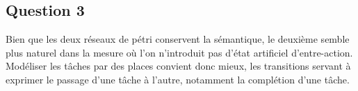 \subsection*{Question 3}

Bien que les deux réseaux de pétri conservent la sémantique, le
deuxième semble plus naturel dans la mesure où l'on n'introduit pas
d'état artificiel d'entre-action. Modéliser les tâches par des places
convient donc mieux, les transitions servant à exprimer le passage
d'une tâche à l'autre, notamment la complétion d'une tâche.
